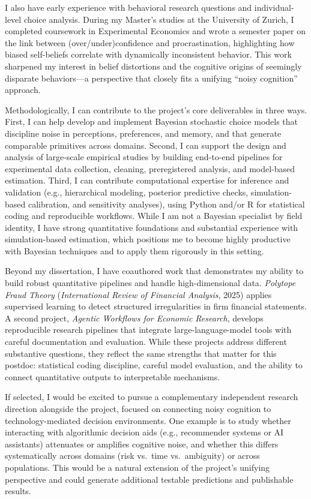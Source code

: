 \documentclass[11pt]{article}
\begin{document}
I also have early experience with behavioral research questions and individual-level choice analysis. During my Master’s studies at the University of Zurich, I completed coursework in Experimental Economics and wrote a semester paper on the link between (over/under)confidence and procrastination, highlighting how biased self-beliefs correlate with dynamically inconsistent behavior. This work sharpened my interest in belief distortions and the cognitive origins of seemingly disparate behaviors---a perspective that closely fits a unifying ``noisy cognition'' approach.

Methodologically, I can contribute to the project’s core deliverables in three ways. First, I can help develop and implement Bayesian stochastic choice models that discipline noise in perceptions, preferences, and memory, and that generate comparable primitives across domains. Second, I can support the design and analysis of large-scale empirical studies by building end-to-end pipelines for experimental data collection, cleaning, preregistered analysis, and model-based estimation. Third, I can contribute computational expertise for inference and validation (e.g., hierarchical modeling, posterior predictive checks, simulation-based calibration, and sensitivity analyses), using Python and/or R for statistical coding and reproducible workflows. While I am not a Bayesian specialist by field identity, I have strong quantitative foundations and substantial experience with simulation-based estimation, which positions me to become highly productive with Bayesian techniques and to apply them rigorously in this setting.

Beyond my dissertation, I have coauthored work that demonstrates my ability to build robust quantitative pipelines and handle high-dimensional data. \textit{Polytope Fraud Theory} (\textit{International Review of Financial Analysis}, 2025) applies supervised learning to detect structured irregularities in firm financial statements. A second project, \textit{Agentic Workflows for Economic Research}, develops reproducible research pipelines that integrate large-language-model tools with careful documentation and evaluation. While these projects address different substantive questions, they reflect the same strengths that matter for this postdoc: statistical coding discipline, careful model evaluation, and the ability to connect quantitative outputs to interpretable mechanisms.

If selected, I would be excited to pursue a complementary independent research direction alongside the project, focused on connecting noisy cognition to technology-mediated decision environments. One example is to study whether interacting with algorithmic decision aids (e.g., recommender systems or AI assistants) attenuates or amplifies cognitive noise, and whether this differs systematically across domains (risk vs.\ time vs.\ ambiguity) or across populations. This would be a natural extension of the project’s unifying perspective and could generate additional testable predictions and publishable results.
\end{document}
